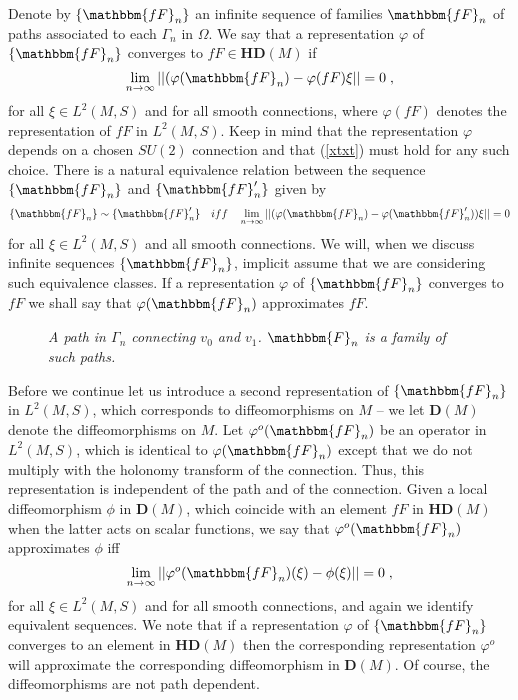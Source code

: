 \documentclass[12pt]{article}
\def\G{\Gamma}
\def\OO{\Omega}
\begin{document}
Denote by $\{\mathbbm{fF}_n\}$  an infinite sequence of families $\mathbbm{fF}_n$ of paths associated to each $\G_n$ in $\OO$.
We say that a representation $\varphi$ of $\{\mathbbm{fF}_n\}$ converges to $fF\in \mathbf{HD}(M) $ if
\begin{equation}
\lim_{n\rightarrow\infty}\vert\vert (\varphi(\mathbbm{fF}_n) - \varphi(fF)\xi \vert\vert = 0\;,
\label{xtxt}
\end{equation}
for all $\xi\in L^2(M,S)$ and for all smooth connections,
where $\varphi(fF)$ denotes the representation of $fF$ in $L^2(M,S)$. Keep in mind that the representation $\varphi$ depends on a chosen $SU(2)$ connection and that (\ref{xtxt}) must hold for any such choice.
There is a natural equivalence relation between the sequence $\{\mathbbm{fF}_n\}$ and $\{\mathbbm{fF}'_n\}$ given by
\begin{equation}
\{\mathbbm{fF}_n\}\sim \{\mathbbm{fF}_n'\}\quad iff \quad \lim_{n\rightarrow\infty}\vert\vert ({\varphi(\mathbbm{fF}_n)} - \varphi(\mathbbm{fF}_n'))\xi \vert\vert = 0
\label{xtxtx}
\end{equation}
for all $\xi\in L^2(M,S)$ and all smooth connections. We will, when we discuss infinite sequences $\{\mathbbm{fF}_n\}$, implicit assume that we are considering such equivalence classes.
If a representation $\varphi$ of $\{\mathbbm{fF}_n\}$ converges to $fF$ we 
shall say that  $\varphi(\mathbbm{fF}_n)$ approximates $fF$.
\begin{figure}[t]
\begin{center}
\resizebox{!}{4cm}{
 }
\end{center}
\caption{\it A path in $\G_n$ connecting $v_0$ and $v_1$. $\mathbbm{F}_n$ is a family of such paths.}
 \label{ronnie2}
\end{figure}


Before we continue let us introduce a second representation of $\{\mathbbm{fF}_n\}$ in $L^2(M,S)$, which corresponds to diffeomorphisms on $M$ -- we let $\mathbf{D}(M) $ denote the diffeomorphisms on $M$.  Let $\varphi^o(\mathbbm{fF}_n)$ be an operator in $L^2(M,S)$, which is identical to $\varphi(\mathbbm{fF}_n)$ except that we do not multiply with the holonomy transform of the connection. Thus, this representation is independent of the path and of the connection. Given a local  diffeomorphism $\phi$ in $\mathbf{D}(M) $, which coincide with an element $fF$ in $\mathbf{HD}(M) $ when the latter acts on scalar functions, we say that $\varphi^o(\mathbbm{fF}_n)$ approximates $\phi$ iff
\begin{equation}
\lim_{n\rightarrow\infty}\vert\vert \varphi^o(\mathbbm{fF}_n) (\xi)  - \phi(\xi)  \vert\vert = 0\;,
\label{xtxtxt}
\end{equation}
for all $\xi\in L^2(M,S)$ and for all smooth connections,
and again we identify equivalent sequences.
We note that if a representation $\varphi$ of $\{\mathbbm{fF}_n\}$ converges to an element in $\mathbf{HD}(M) $ then the corresponding representation $\varphi^o$ will approximate the corresponding diffeomorphism in $\mathbf{D}(M) $. Of course, the diffeomorphisms are not path dependent.
\end{document}
